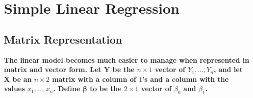 \setcounter{section}{10}
\section{Simple Linear Regression}

\setcounter{subsection}{4}
\subsection{Matrix Representation}
\graphicspath{{notes/img}}

\newpage

\textbf{The linear model becomes much easier to manage when represented in matrix and vector form. Let
$\bm{Y}$ be the $n \times 1$ vector of $Y_1, \dots, Y_n$, and let $\bm{X}$ be an $n \times 2$ matrix with a column of $1$'s and a column
with the values $x_1, \dots, x_n$. Define $\bm{\beta}$ to be the $2\times 1$ vector of $\beta_0$ and $\beta_1$.}
